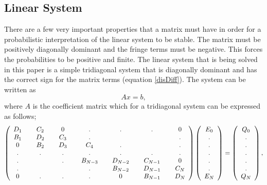 \belowSubSecSkip


\subsection{Linear System}
\label{sec:MonteCarlo-Linear-System}

\noindent
	\indent There are a few very important properties that a matrix must have in order for a probabilistic interpretation of the linear system to be stable. The matrix must be positively diagonally dominant and the fringe terms must be negative. This forces the probabilities to be positive and finite. The linear system that is being solved in this paper is a simple tridiagonal system that is diagonally dominant and has the correct sign for the matrix terms (equation \ref{disDiff}). The system can be written as
	\begin{equation}
	\label{linearSystem}
	Ax=b,
	\end{equation}
	where $A$ is the coefficient matrix which for a tridiagonal system can be expressed as follows;
	\[
	\left(
	\begin{array}{ c c c c c c c c c c c c c}
	D_1 & \, & C_2 & \, & 0  & \, & . & \, & . & \, & . & \, & 0 \\
	B_1 & \, & D_2 & \, & C_3  & \, & . & \, & \, & \, & \, & \, & . \\
	0 & \, & B_2 & \, & D_3  & \, & C_4 & \, & . & \, & \, & \, & . \\
	. & \, & . & \, & .  & \, & . & \, & . & \, & . & \, & . \\
	. & \, & \, & \, & .  & \, & B_{N-3} & \, & D_{N-2} & \, & C_{N-1} & \, & 0 \\
	. & \, & \, & \, & \,  & \, & . & \, & B_{N-2} & \, & D_{N-1} & \, & C_{N} \\
	0 & \, & . & \, & .  & \, & . & \, & 0 & \, & B_{N-1} & \, & D_{N} \\
	\end{array}
	\right)
	\left(
	\begin{array}{ c }
	E_0 \\
	. \\
	. \\
	. \\
	. \\
	. \\
	E_N 
	\end{array}
	\right)
	=
	\left(
	\begin{array}{ c }
	Q_0 \\
	. \\
	. \\
	. \\
	. \\
	. \\
	Q_N 
	\end{array}
	\right),
	\]
